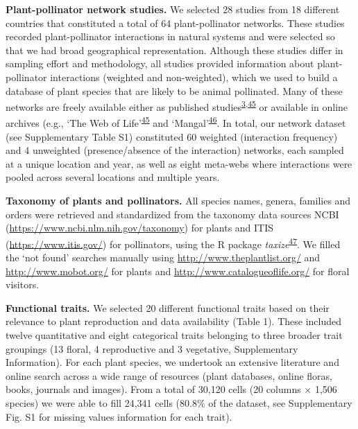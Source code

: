 \documentclass[12pt,a4paper,]{article}
\begin{document}
\textbf{Plant-pollinator network studies.} We selected 28 studies from
18 different countries that constituted a total of 64 plant-pollinator
networks. These studies recorded plant-pollinator interactions in
natural systems and were selected so that we had broad geographical
representation. Although these studies differ in sampling effort and
methodology, all studies provided information about plant-pollinator
interactions (weighted and non-weighted), which we used to build a
database of plant species that are likely to be animal pollinated. Many
of these networks are freely available either as published
studies\textsuperscript{\protect\hyperlink{ref-carvalheiro2014}{3},\protect\hyperlink{ref-fortuna2010}{45}}
or available in online archives (e.g., `The Web of
Life'\textsuperscript{\protect\hyperlink{ref-fortuna2010}{45}} and
`Mangal'\textsuperscript{\protect\hyperlink{ref-poisot2016}{46}}. In
total, our network dataset (see Supplementary Table S1) constituted 60
weighted (interaction frequency) and 4 unweighted (presence/absence of
the interaction) networks, each sampled at a unique location and year,
as well as eight meta-webs where interactions were pooled across several
locations and multiple years.

\textbf{Taxonomy of plants and pollinators.} All species names, genera,
families and orders were retrieved and standardized from the taxonomy
data sources NCBI (\url{https://www.ncbi.nlm.nih.gov/taxonomy}) for
plants and ITIS (\url{https://www.itis.gov/}) for pollinators, using the
R package
\emph{taxize}\textsuperscript{\protect\hyperlink{ref-chamberlain2020}{47}}.
We filled the `not found' searches manually using
\url{http://www.theplantlist.org/} and \url{http://www.mobot.org/} for
plants and \url{http://www.catalogueoflife.org/} for floral visitors.

\textbf{Functional traits.} We selected 20 different functional traits
based on their relevance to plant reproduction and data availability
(Table 1). These included twelve quantitative and eight categorical
traits belonging to three broader trait groupings (13 floral, 4
reproductive and 3 vegetative, Supplementary Information). For each
plant species, we undertook an extensive literature and online search
across a wide range of resources (plant databases, online floras, books,
journals and images). From a total of 30,120 cells (20 columns × 1,506
species) we were able to fill 24,341 cells (80.8\% of the dataset, see
Supplementary Fig. S1 for missing values information for each trait).
\end{document}
